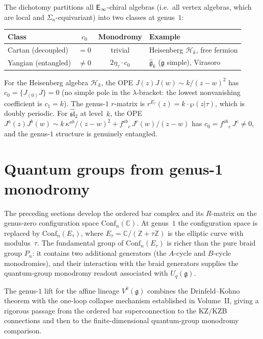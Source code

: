 \begin{remark}
\label{rem:annular-pole-classification}
The dichotomy partitions all $\mathsf{E}_{\infty}$-chiral algebras
(i.e.\ all vertex algebras, which are local and
$\Sigma_n$-equivariant) into two classes at genus~$1$:
\begin{center}
\begin{tabular}{l@{\quad}c@{\quad}c@{\quad}l}
\toprule
\textbf{Class} & $c_0$ & \textbf{Monodromy} & \textbf{Example} \\
\midrule
Cartan (decoupled) & $=0$ & trivial &
 Heisenberg $\mathcal{H}_k$, free fermion \\
Yangian (entangled) & $\ne 0$ & $2\eta_\tau\cdot c_0$ &
 $\widehat{\mathfrak{g}}_k$ ($\mathfrak{g}$ simple),
 Virasoro \\
\bottomrule
\end{tabular}
\end{center}
For the Heisenberg algebra $\mathcal{H}_k$, the OPE
$J(z)J(w)\sim k/(z-w)^2$ has $c_0=\{J{}_{(0)}J\}=0$ (no
simple pole in the $\lambda$-bracket: the lowest nonvanishing
coefficient is $c_1=k$). The genus-$1$ $r$-matrix is
$r^{E_\tau}(z)=k\cdot\wp(z|\tau)$, which is doubly periodic.
For $\widehat{\mathfrak{sl}}_2$ at level~$k$, the OPE
$J^a(z)J^b(w)\sim k\,\kappa^{ab}/(z-w)^2+f^{ab}{}_c\,J^c(w)/(z-w)$
has $c_0=f^{ab}{}_c\,J^c\ne 0$, and the genus-$1$ structure
is genuinely entangled.
\end{remark}



\section{Quantum groups from genus-1 monodromy}
\label{sec:genus1-monodromy}

The preceding sections develop the ordered bar complex and its $R$-matrix
on the genus-zero configuration space $\mathrm{Conf}_n(\mathbb{C})$.
At genus~$1$ the configuration space is replaced by
$\mathrm{Conf}_n(E_\tau)$, where $E_\tau = \mathbb{C}/(\mathbb{Z}
+ \tau\mathbb{Z})$ is the elliptic curve with modulus~$\tau$.
The fundamental group of $\mathrm{Conf}_n(E_\tau)$ is
richer than the pure braid group $P_n$: it contains two
additional generators (the $A$-cycle and $B$-cycle monodromies),
and their interaction with the braid generators supplies the
quantum-group monodromy readout associated with
$U_q(\mathfrak{g})$.

The genus-$1$ lift for the affine lineage
$V^k(\mathfrak{g})$ combines the Drinfeld--Kohno theorem with the
one-loop collapse mechanism established in Volume~II, giving a
rigorous passage from the ordered bar superconnection to the KZ/KZB
connections and then to the finite-dimensional quantum-group
monodromy comparison.

